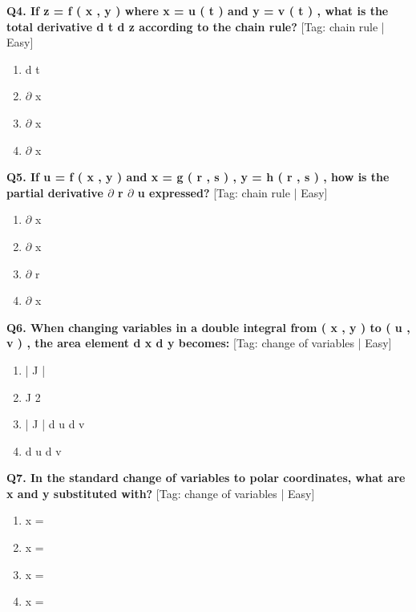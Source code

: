 \noindent\textbf{Q4. If z = f ( x , y ) where x = u ( t ) and y = v ( t ) , what is the total derivative d t d z according to the chain rule?} \hfill [Tag: chain rule | Easy]
\begin{enumerate}[label=(\alph*),topsep=2pt,itemsep=1pt,partopsep=0pt,parsep=0pt]
    \item {{d t}}
    \item {{$\partial$ x}}
    \item {{$\partial$ x}}
    \item {{$\partial$ x}}
\end{enumerate}
\vspace{2mm}

\noindent\textbf{Q5. If u = f ( x , y ) and x = g ( r , s ) , y = h ( r , s ) , how is the partial derivative $\partial$ r $\partial$ u expressed?} \hfill [Tag: chain rule | Easy]
\begin{enumerate}[label=(\alph*),topsep=2pt,itemsep=1pt,partopsep=0pt,parsep=0pt]
    \item {{$\partial$ x}}
    \item {{$\partial$ x}}
    \item {{$\partial$ r}}
    \item {{$\partial$ x}}
\end{enumerate}
\vspace{2mm}

\noindent\textbf{Q6. When changing variables in a double integral from ( x , y ) to ( u , v ) , the area element d x d y becomes:} \hfill [Tag: change of variables | Easy]
\begin{enumerate}[label=(\alph*),topsep=2pt,itemsep=1pt,partopsep=0pt,parsep=0pt]
    \item {{| J |}}
    \item {{J 2}}
    \item {{| J | d u d v}}
    \item {{d u d v}}
\end{enumerate}
\vspace{2mm}

\noindent\textbf{Q7. In the standard change of variables to polar coordinates, what are x and y substituted with?} \hfill [Tag: change of variables | Easy]
\begin{enumerate}[label=(\alph*),topsep=2pt,itemsep=1pt,partopsep=0pt,parsep=0pt]
    \item {{x =}}
    \item {{x =}}
    \item {{x =}}
    \item {{x =}}
\end{enumerate}
\vspace{2mm}

